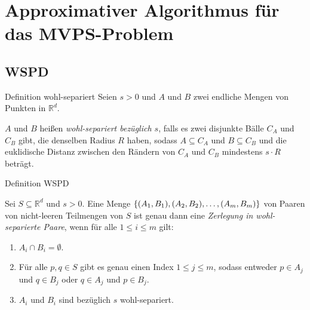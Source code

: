 \documentclass{beamer}
\begin{document}
	\section{Approximativer Algorithmus für das MVPS-Problem}
	\subsection{WSPD}
	\begin{frame}{Definition wohl-separiert}
		Seien $s > 0$ und $A$ und $B$ zwei endliche Mengen von Punkten in $\mathbb{R}^d$. 
		\begin{definition}
			$A$ und $B$ heißen \emph{wohl-separiert bezüglich $s$}, falls es zwei disjunkte Bälle $C_A$ und $C_B$ gibt, die denselben Radius $R$ haben, sodass $A \subseteq C_A$ und $B \subseteq C_B$ und die euklidische Distanz zwischen den Rändern von $C_A$ und $C_B$ mindestens $s\cdot R$ beträgt.
		\end{definition}
	\end{frame}
	
	\begin{frame}{Definition WSPD}
		\begin{definition}
			\label{def:wspd}
			Sei $S \subseteq \mathbb{R}^d$ und $s > 0$. 
			Eine Menge $ \{(A_1, B_1), (A_2, B_2), \mathellipsis, (A_m, B_m)\}$ von Paaren von nicht-leeren Teilmengen von $S$ ist genau dann eine \emph{Zerlegung in wohl-separierte Paare}, wenn für alle $1 \leq i \leq m$ gilt:
			\begin{enumerate}
				\item $A_i \cap B_i = \emptyset$.
				\item Für alle $p, q \in S$ gibt es genau einen Index $1 \leq j \leq m$, sodass entweder $p \in A_j$ und $q \in B_j$ oder $q \in A_j$ und $p \in B_j$.
				\item $A_i$ und $B_i$ sind bezüglich $s$ wohl-separiert.
			\end{enumerate}
		\end{definition}
	\end{frame}
	
\end{document}
